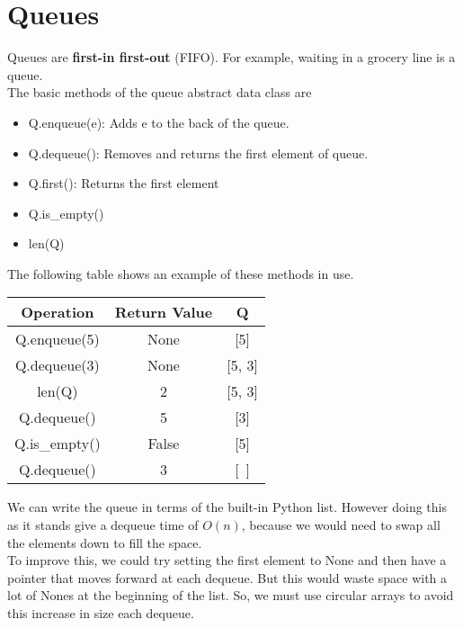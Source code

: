 \documentclass[]{article}
\begin{document}
\section{Queues}\bigbreak\bigbreak

Queues are \textbf{first-in first-out} (FIFO). For example, waiting in a grocery line is a queue. \\

The basic methods of the queue abstract data class are

\begin{itemize}
	\item Q.enqueue(e): Adds e to the back of the queue.
	\item Q.dequeue(): Removes and returns the first element of queue.
	\item Q.first(): Returns the first element
	\item Q.is\_empty()
	\item len(Q)
\end{itemize}\bigbreak

The following table shows an example of these methods in use.

\begin{center}
	\begin{table}[h!]\centering
		\begin{tabular}{|c|c|c|}
			\hline
			Operation   &Return Value   &Q\\\hline
			Q.enqueue(5) & None & [5]\\
			Q.dequeue(3) & None & [5, 3]\\
			len(Q) & 2 & [5, 3]\\
			Q.dequeue() & 5 & [3]\\
			Q.is\_empty() & False & [5]\\
			Q.dequeue() & 3 & [~]\\\hline
		\end{tabular}
	\end{table}
\end{center}

We can write the queue in terms of the built-in Python list. However doing this as it stands give a dequeue time of $O(n)$, because we would need to swap all the elements down to fill the space.\\

To improve this, we could try setting the first element to None and then have a pointer that moves forward at each dequeue. But this would waste space with a lot of Nones at the beginning of the list. So, we must use circular arrays to avoid this increase in size each dequeue.
\end{document}
